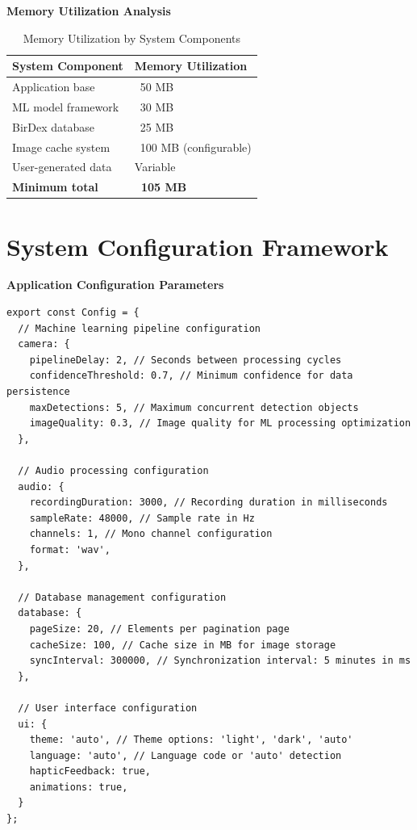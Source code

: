 \textbf{Memory Utilization Analysis}
\begin{table}[H]
\centering
\begin{tabular}{|l|l|}
\hline
\textbf{System Component} & \textbf{Memory Utilization} \\
\hline
Application base & ~50 MB \\
ML model framework & ~30 MB \\
BirDex database & ~25 MB \\
Image cache system & ~100 MB (configurable) \\
User-generated data & Variable \\
\textbf{Minimum total} & \textbf{~105 MB} \\
\hline
\end{tabular}
\caption{Memory Utilization by System Components}
\label{tab:memory_usage}
\end{table}

\section{System Configuration Framework}

\textbf{Application Configuration Parameters}
\begin{lstlisting}[caption=Configuration Options, label=lst:config_options]
export const Config = {
  // Machine learning pipeline configuration
  camera: {
    pipelineDelay: 2, // Seconds between processing cycles
    confidenceThreshold: 0.7, // Minimum confidence for data persistence
    maxDetections: 5, // Maximum concurrent detection objects
    imageQuality: 0.3, // Image quality for ML processing optimization
  },
  
  // Audio processing configuration
  audio: {
    recordingDuration: 3000, // Recording duration in milliseconds
    sampleRate: 48000, // Sample rate in Hz
    channels: 1, // Mono channel configuration
    format: 'wav',
  },
  
  // Database management configuration
  database: {
    pageSize: 20, // Elements per pagination page
    cacheSize: 100, // Cache size in MB for image storage
    syncInterval: 300000, // Synchronization interval: 5 minutes in ms
  },
  
  // User interface configuration
  ui: {
    theme: 'auto', // Theme options: 'light', 'dark', 'auto'
    language: 'auto', // Language code or 'auto' detection
    hapticFeedback: true,
    animations: true,
  }
};
\end{lstlisting}

